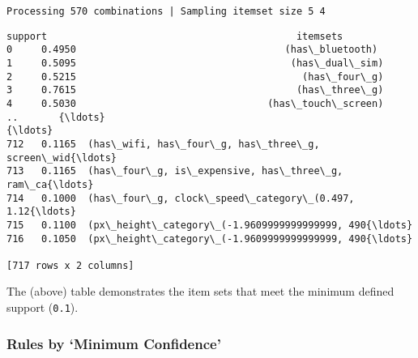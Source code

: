 \documentclass[11pt]{article}
\makeatletter
\newcommand{\boxspacing}{\kern\kvtcb@left@rule\kern\kvtcb@boxsep}
\newcommand{\prompt}[4]{
        {\ttfamily\llap{{\color{#2}[#3]:\hspace{3pt}#4}}\vspace{-\baselineskip}}
    }
\makeatother
\begin{document}
    \begin{Verbatim}[commandchars=\\\{\}]
Processing 570 combinations | Sampling itemset size 5 4
    \end{Verbatim}

            \begin{tcolorbox}[breakable, size=fbox, boxrule=.5pt, pad at break*=1mm, opacityfill=0]
\prompt{Out}{outcolor}{35}{\boxspacing}
\begin{Verbatim}[commandchars=\\\{\}]
     support                                           itemsets
0     0.4950                                    (has\_bluetooth)
1     0.5095                                     (has\_dual\_sim)
2     0.5215                                       (has\_four\_g)
3     0.7615                                      (has\_three\_g)
4     0.5030                                 (has\_touch\_screen)
..       {\ldots}                                                {\ldots}
712   0.1165  (has\_wifi, has\_four\_g, has\_three\_g, screen\_wid{\ldots}
713   0.1165  (has\_four\_g, is\_expensive, has\_three\_g, ram\_ca{\ldots}
714   0.1000  (has\_four\_g, clock\_speed\_category\_(0.497, 1.12{\ldots}
715   0.1100  (px\_height\_category\_(-1.9609999999999999, 490{\ldots}
716   0.1050  (px\_height\_category\_(-1.9609999999999999, 490{\ldots}

[717 rows x 2 columns]
\end{Verbatim}
\end{tcolorbox}
        
    The (above) table demonstrates the item sets that meet the minimum
defined support (\texttt{0.1}).

    \hypertarget{rules-by-minimum-confidence}{%
\subsubsection{Rules by `Minimum
Confidence'}\label{rules-by-minimum-confidence}}
\end{document}
